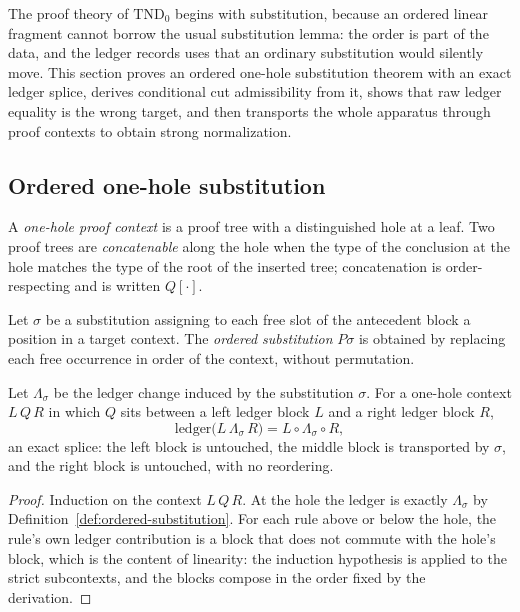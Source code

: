 \label{sec:normalization-body}

The proof theory of $\mathrm{TND}_0$ begins with substitution, because an ordered linear
fragment cannot borrow the usual substitution lemma: the order is part of the data, and the
ledger records uses that an ordinary substitution would silently move.  This section proves
an ordered one-hole substitution theorem with an exact ledger splice, derives conditional
cut admissibility from it, shows that raw ledger equality is the wrong target, and then
transports the whole apparatus through proof contexts to obtain strong normalization.

\subsection{Ordered one-hole substitution}

\begin{definition}\label{def:one-hole-context}
A \emph{one-hole proof context} is a proof tree with a distinguished hole at a leaf.  Two
proof trees are \emph{concatenable} along the hole when the type of the conclusion at the
hole matches the type of the root of the inserted tree; concatenation is order-respecting
and is written $Q[\cdot]$.
\end{definition}

\begin{definition}\label{def:ordered-substitution}
Let $\sigma$ be a substitution assigning to each free slot of the antecedent block a
position in a target context.  The \emph{ordered substitution} $P\sigma$ is obtained by
replacing each free occurrence in order of the context, without permutation.
\end{definition}

\begin{theorem}\label{thm:substitution-splice}
Let $\Lambda_\sigma$ be the ledger change induced by the substitution $\sigma$.  For a
one-hole context $L\,Q\,R$ in which $Q$ sits between a left ledger block $L$ and a right
ledger block $R$,
\[
  \mathrm{ledger}\bigl(L\,\Lambda_\sigma\,R\bigr)
  =
  L\circ\Lambda_\sigma\circ R ,
\]
an exact splice: the left block is untouched, the middle block is transported by $\sigma$,
and the right block is untouched, with no reordering.
\end{theorem}

\begin{proof}
Induction on the context $L\,Q\,R$.  At the hole the ledger is exactly
$\Lambda_\sigma$ by Definition~\ref{def:ordered-substitution}.  For each rule above or
below the hole, the rule's own ledger contribution is a block that does not commute with
the hole's block, which is the content of linearity: the induction hypothesis is applied
to the strict subcontexts, and the blocks compose in the order fixed by the derivation.
\end{proof}

